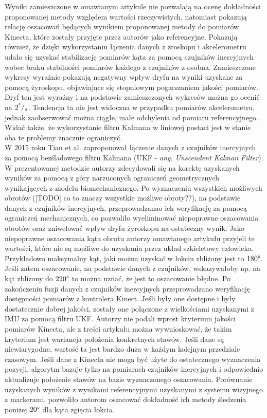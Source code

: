	Wyniki zamieszczone w omawianym artykule \cite{Bo2011a} nie pozwalają na ocenę dokładności proponowanej metody względem wartości rzeczywistych, natomiast pokazują relację oszacowań będących wynikiem proponowanej metody do pomiarów Kinecta, które zostały przyjęte przez autorów jako referencyjne. Pokazują również, że dzięki wykorzystaniu łączenia danych z żroskopu i akcelerometru udało się uzyskać stabilizację pomiarów kąta za pomocą czujników inercyjnych wobec braku stabilności pomiarów każdego z czujników z osobna. Zamieszczone wykresy wyraźnie pokazują negatywny wpływ dryfu na wyniki uzyskane za pomocą żyroskopu, objawiające się stopniowym pogarszaniem jakości pomiarów. Dryf ten jest wyraźny i na podstawie zamieszczonych wykresów można go ocenić na $2^\degree/_s$. Tendencja ta nie jest widoczna w przypadku pomiarów akcelerometru, jednak zaobserwować można ciągłe, małe odchylenia od pomiaru referencyjnego. Widać także, że wykorzystanie filtru Kalmana w liniowej postaci jest w stanie oba te problemy znacznie ograniczyć.\\
	
	W 2015 roku Tian et al. \cite{Tian2015a} zaproponował łączenie danych z czujników inercyjnych za pomocą bezśladowego filtru Kalmana (UKF - \emph{ang. Unscendent Kalman Filter}). W prezentowanej metodzie autorzy zdecydowali się na korektę uzyskanych wyników za pomocą z góry narzuconych ograniczeń geometrycznych wynikających z modelu biomechanicznego. Po wyznaczeniu wszystkich możliwych obrotów ([TODO] co to znaczy wszystkie możliwe obroty??), na podstawie danych z czujników inercyjnych, przeprowadzanao ich weryfikację za pomocą ograniczeń mechanicznych, co pozwoliło wyeliminować niepoprawne oszacowania obrotów oraz zniwelować wpływ dryfu żyroskopu na ostateczny wynik. Jako niepoprawne oszacowania kąta obrotu autorzy omawianego artykułu przyjeli te wartości, które nie są możliwe do uzyskania przez układ szkieletowy człowieka. Przykładowo maksymalny kąt, jaki można uzyskać w łokciu zbliżony jest to $180\degree$. Jeśli zatem oszacowanie, na podstawie danych z czujników, wskazywałoby np. na kąt zbliżony do $220\degree$ to można uznać, że jest to oszacowanie błędne. Po zakończeniu fuzji danych z czujników inercyjnych przeprowadzano weryfikację dostępności pomiarów z kontrolera Kinect. Jeśli były one dostępne i były dostatecznie dobrej jakości, zostały one połączone z wielkościami uzyskanymi z IMU za pomocą filtru UKF. Autorzy nie podali wprost kryterium jakości pomiarów Kinecta, ale z treści artykułu można wywnioskować, że takim kryterium jest wariancja położenia konkretnych stawów. Jeśli dane są niewiarygodne, wartość ta jest bardzo duża w każdym kolejnym przedziale czasowym. Jeśli dane z Kinecta nie mogą być użyte do ostatecznego wyznaczenia pozycji, algorytm bazuje tylko na pomiarach czujników inercyjnych i odpowiednio aktualizuje położenie stawów na bazie wyznaczonego oszacowania. Porównanie uzyskanych wyników z wynikami referencyjnymi uzyskanymi z systemu wizyjnego z markerami, pozwoliło autorom oszacować dokładność ich metody śledzenia poniżej $20\degree$ dla kąta zgięcia łokcia.\\
	

